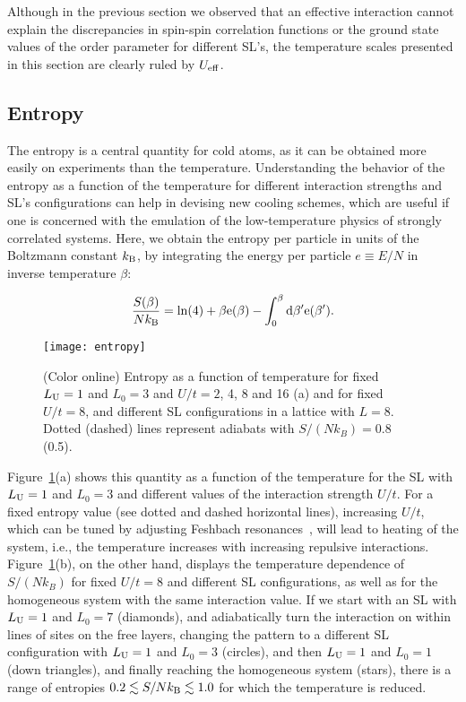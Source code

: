 \documentclass[aps,pra,reprint,twocolumn,showpacs,longbibliography,superscriptaddress]{revtex4-1}
\begin{document}
Although in the previous section we observed that an effective interaction cannot explain the discrepancies in spin-spin correlation functions or the ground state values of the order parameter for different SL's, the temperature scales presented in this section are clearly ruled by $U_{\rm eff}$.

\subsection{Entropy}

The entropy is a central quantity for cold atoms, as it can be obtained more easily on  experiments than the temperature. Understanding the behavior of the entropy as a function of the temperature for  different interaction strengths and SL's configurations can help in devising new cooling schemes, which are useful if one is concerned with the emulation of the low-temperature physics of strongly correlated systems. Here, we obtain the entropy per particle in units of the Boltzmann constant $k_{\rm B}$, by integrating the energy per particle $e\equiv E/N$ in inverse temperature $\beta$:

\begin{equation}
\frac {S(\beta)}{Nk_{\rm B}}= \rm{ln}(4)+ \beta e(\beta) - \int_0^\beta d\beta^\prime  e(\beta^\prime).
\end{equation}

\begin{figure}[!tb] %
  \texttt{[image: entropy]}
 \caption{(Color online) Entropy as a function of temperature for fixed $L_{\rm U}=1$ and $L_0=3$ and $U/t=2$, 4, 8 and 16 (a) and for fixed $U/t=8$, and different SL configurations in a lattice with $L=8$. Dotted (dashed) lines represent adiabats with $S/(Nk_B)=0.8$ (0.5).}
 \label{fig:entropy}
\end{figure}

Figure~\ref{fig:entropy}(a) shows this quantity as a function of the temperature for the SL with $L_{\rm U}=1$ and $L_0=3$ and different values of the interaction strength $U/t$. For a fixed entropy  value  (see dotted and dashed horizontal lines), increasing $U/t$, which can be tuned by adjusting Feshbach resonances~\cite{Bloch08}, will lead to heating of the system, i.e., the temperature increases with increasing repulsive interactions. Figure~\ref{fig:entropy}(b), on the other hand, displays the temperature dependence of $S/(Nk_B)$ for fixed  $U/t=8$ and different SL configurations, as well as for the homogeneous system with the same interaction value.  If we start with an SL with $L_{\rm U}=1$ and $L_0=7$ (diamonds), and adiabatically turn the interaction on within lines of sites on the free layers, changing the pattern to a different SL configuration with $L_{\rm U}=1$ and $L_0=3$  (circles), and then $L_{\rm U}=1$ and $L_0=1$ (down triangles), and finally reaching the homogeneous system (stars), there is a range of entropies $0.2 \lesssim S/Nk_{\rm B} \lesssim 1.0$ for which the temperature is reduced.  
\end{document}

